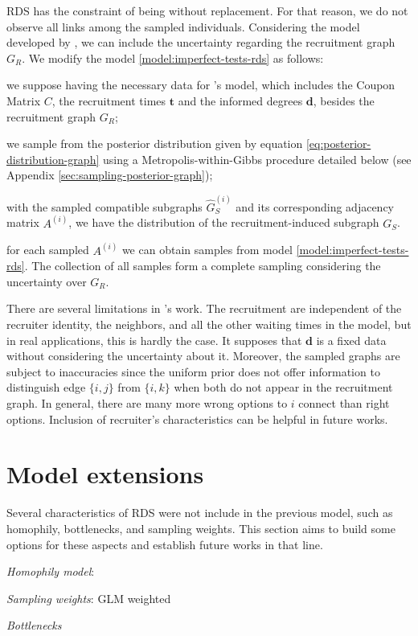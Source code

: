 RDS has the constraint of being without replacement. For that reason, we do
not observe all links among the sampled individuals. Considering the model
developed by 
\textcite{crawford2016}, we can include the uncertainty regarding the
recruitment graph $G_R$. We modify the model \eqref{model:imperfect-tests-rds} as
follows: 
\begin{alineas}
  \item we suppose having the necessary data for \textcite{crawford2016}'s
  model, which includes the Coupon Matrix $C$, the recruitment times
  $\boldsymbol{t}$ and the informed degrees $\boldsymbol{d}$, besides the
  recruitment graph $G_R$;
  \item we sample from the posterior distribution given by equation
  \eqref{eq:posterior-distribution-graph} using a Metropolis-within-Gibbs
  procedure detailed below (see Appendix \ref{sec:sampling-posterior-graph});
  \item with the sampled compatible subgraphs $\hat{G}_S^{(i)}$ and its
  corresponding adjacency matrix $A^{(i)}$, we have the distribution of the
  recruitment-induced subgraph $G_S$. 
  \item for each sampled $A^{(i)}$ we can obtain samples from model
  \eqref{model:imperfect-tests-rds}. The collection of all samples form a
  complete sampling considering the uncertainty over $G_R$. 
\end{alineas}

There are several limitations in \textcite{crawford2016}'s work. The
recruitment are independent of the recruiter identity, the neighbors,
and all the other waiting times in the model, but in real applications, this is
hardly the case. It supposes that $\boldsymbol{d}$ is a fixed data without
considering the uncertainty about it. Moreover, the sampled graphs are subject
to inaccuracies since the uniform prior does not offer information to
distinguish edge $\{i, j\}$ from $\{i, k\}$ when both do not appear in the
recruitment graph. In general, there are many more wrong options to $i$
connect than right options. Inclusion of recruiter's characteristics can be
helpful in future works. 

\section{Model extensions}

Several characteristics of RDS were not include in the previous model, such as
homophily, bottlenecks, and sampling weights. This section aims to build some
options for these aspects and establish future works in that line.

\begin{alineas}
  \item {\em Homophily model}: \cite{yauck2021general}
  \item {\em Sampling weights}: GLM weighted
  \item {\em Bottlenecks}
\end{alineas}